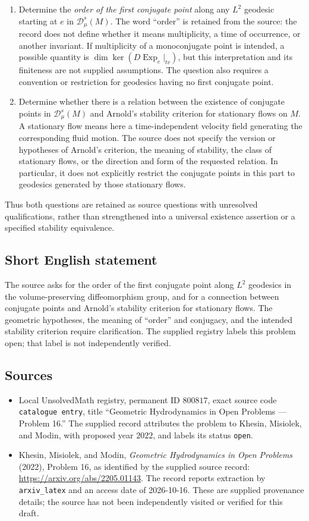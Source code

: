 \documentclass[11pt]{article}
\begin{document}
\begin{enumerate}
\item[(a)] Determine the \emph{order of the first conjugate point} along any \(L^2\) geodesic starting at \(e\) in \(\mathscr{D}_\mu^s(M)\). The word ``order'' is retained from the source: the record does not define whether it means multiplicity, a time of occurrence, or another invariant. If multiplicity of a monoconjugate point is intended, a possible quantity is \(\dim\ker(D\operatorname{Exp}_e\vert_{tv})\), but this interpretation and its finiteness are not supplied assumptions. The question also requires a convention or restriction for geodesics having no first conjugate point.
\item[(b)] Determine whether there is a relation between the existence of conjugate points in \(\mathscr{D}_\mu^s(M)\) and Arnold's stability criterion for stationary flows on \(M\). A stationary flow means here a time-independent velocity field generating the corresponding fluid motion. The source does not specify the version or hypotheses of Arnold's criterion, the meaning of stability, the class of stationary flows, or the direction and form of the requested relation. In particular, it does not explicitly restrict the conjugate points in this part to geodesics generated by those stationary flows.
\end{enumerate}
Thus both questions are retained as source questions with unresolved qualifications, rather than strengthened into a universal existence assertion or a specified stability equivalence.
\subsection{Short English statement}
The source asks for the order of the first conjugate point along \(L^2\) geodesics in the volume-preserving diffeomorphism group, and for a connection between conjugate points and Arnold's stability criterion for stationary flows. The geometric hypotheses, the meaning of ``order'' and conjugacy, and the intended stability criterion require clarification. The supplied registry labels this problem open; that label is not independently verified.
\subsection{Sources}
\begin{itemize}
\item Local UnsolvedMath registry, permanent ID \(800817\), exact source code \texttt{catalogue entry}, title ``Geometric Hydrodynamics in Open Problems --- Problem 16.'' The supplied record attributes the problem to Khesin, Misiolek, and Modin, with proposed year \(2022\), and labels its status \texttt{open}.
\item Khesin, Misiolek, and Modin, \emph{Geometric Hydrodynamics in Open Problems} (2022), Problem 16, as identified by the supplied source record: \url{https://arxiv.org/abs/2205.01143}. The record reports extraction by \texttt{arxiv\_latex} and an access date of 2026-10-16. These are supplied provenance details; the source has not been independently visited or verified for this draft.
\end{itemize}
\end{document}
